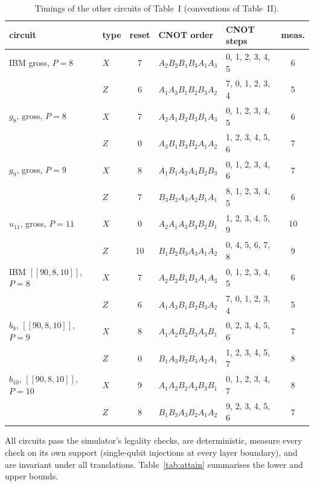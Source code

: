 \documentclass[aps,prl,twocolumn,superscriptaddress,nofootinbib]{revtex4-2}
\newcommand{\code}[1]{[[#1]]}
\begin{document}
\begin{table}[h]
\caption{Timings of the other circuits of Table~I (conventions of Table~II).}
\label{tab:timingS}
\begin{ruledtabular}
\begin{tabular}{llcllc}
circuit & type & reset & CNOT order & CNOT steps & meas.\\
\hline
IBM gross, $P=8$ & $X$ & 7 & $A_2B_2B_1B_3A_1A_3$ & 0, 1, 2, 3, 4, 5 & 6\\
 & $Z$ & 6 & $A_1A_3B_1B_2B_3A_2$ & 7, 0, 1, 2, 3, 4 & 5\\
$g_8$, gross, $P=8$ & $X$ & 7 & $A_2A_1B_2B_3B_1A_3$ & 0, 1, 2, 3, 4, 5 & 6\\
 & $Z$ & 0 & $A_3B_1B_3B_2A_1A_2$ & 1, 2, 3, 4, 5, 6 & 7\\
$g_9$, gross, $P=9$ & $X$ & 8 & $A_1B_1A_2A_3B_2B_3$ & 0, 1, 2, 3, 4, 6 & 7\\
 & $Z$ & 7 & $B_3B_2A_3A_2B_1A_1$ & 8, 1, 2, 3, 4, 5 & 6\\
$u_{11}$, gross, $P=11$ & $X$ & 0 & $A_2A_1A_3B_3B_2B_1$ & 1, 2, 3, 4, 5, 9 & 10\\
 & $Z$ & 10 & $B_1B_2B_3A_3A_1A_2$ & 0, 4, 5, 6, 7, 8 & 9\\
IBM $\code{90,8,10}$, $P=8$ & $X$ & 7 & $A_2B_2B_1B_3A_1A_3$ & 0, 1, 2, 3, 4, 5 & 6\\
 & $Z$ & 6 & $A_1A_3B_1B_2B_3A_2$ & 7, 0, 1, 2, 3, 4 & 5\\
$b_9$, $\code{90,8,10}$, $P=9$ & $X$ & 8 & $A_1A_2B_2B_3A_3B_1$ & 0, 2, 3, 4, 5, 6 & 7\\
 & $Z$ & 0 & $B_1A_3B_2B_3A_2A_1$ & 1, 2, 3, 4, 5, 7 & 8\\
$b_{10}$, $\code{90,8,10}$, $P=10$ & $X$ & 9 & $A_1A_2B_2A_3B_3B_1$ & 0, 1, 2, 3, 4, 7 & 8\\
 & $Z$ & 8 & $B_1B_3A_3B_2A_1A_2$ & 9, 2, 3, 4, 5, 6 & 7\\
\end{tabular}
\end{ruledtabular}
\end{table}

All circuits pass the simulator's legality checks, are deterministic, measure every check on
its own support (single-qubit injections at every layer boundary), and are invariant under
all translations. Table~\ref{tab:attain} summarises the lower and upper bounds.
\end{document}
